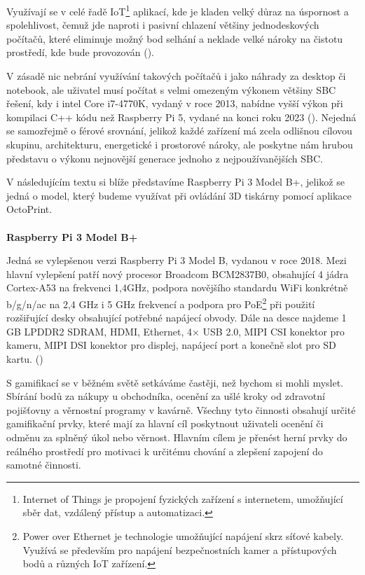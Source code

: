 \documentclass[twoside, 12pt]{article}
\begin{document}
Využívají se v celé řadě IoT\footnote{Internet of Things je propojení fyzických zařízení s internetem, umožňující sběr dat, vzdálený přístup a automatizaci.} aplikací, kde je kladen velký důraz na úspornost a spolehlivost, čemuž jde naproti i pasivní chlazení většiny jednodeskových počítačů, které eliminuje možný bod selhání a neklade velké nároky na čistotu prostředí, kde bude provozován (\cite{RaspberryPasssive}).

V zásadě nic nebrání využívání takových počítačů i jako náhrady za desktop či notebook, ale uživatel musí počítat s velmi omezeným výkonem většiny SBC řešení, kdy i intel Core i7-4770K, vydaný v roce 2013, nabídne vyšší výkon při kompilaci C++ kódu než Raspberry Pi 5, vydané na konci roku 2023 (\cite{RaspberryPerformance}). Nejedná se samozřejmě o férové srovnání, jelikož každé zařízení má zcela odlišnou cílovou skupinu, architekturu, energetické i prostorové nároky, ale poskytne nám hrubou představu o výkonu nejnovější generace jednoho z nejpoužívanějších SBC.

V následujícím textu si blíže představíme Raspberry Pi 3 Model B+, jelikož se jedná o model, který budeme využívat při ovládání 3D tiskárny pomocí aplikace OctoPrint.
\\
\\
\textbf{Raspberry Pi 3 Model B+}

Jedná se vylepšenou verzi Raspberry Pi 3 Model B, vydanou v roce 2018. Mezi hlavní vylepšení patří nový procesor Broadcom BCM2837B0, obsahující 4 jádra Cortex-A53 na frekvenci 1,4GHz, podpora novějšího standardu WiFi konkrétně b/g/n/ac na 2,4 GHz i 5 GHz frekvencí a podpora pro PoE\footnote{Power over Ethernet je technologie umožňující napájení skrz síťové kabely. Využívá se především pro napájení bezpečnostních kamer a přístupových bodů a různých IoT zařízení.} při použití rozšiřující desky obsahující potřebné napájecí obvody. Dále na desce najdeme 1 GB LPDDR2 SDRAM, HDMI, Ethernet, 4× USB 2.0, MIPI CSI konektor pro kameru, MIPI DSI konektor pro displej, napájecí port a konečně slot pro SD kartu. (\cite{Raspberry3B})


S gamifikací se v běžném světě setkáváme častěji, než bychom si mohli myslet. Sbírání bodů za nákupy u obchodníka, ocenění za ušlé kroky od zdravotní pojišťovny a věrnostní programy v kavárně. Všechny tyto činnosti obsahují určité gamifikační prvky, které mají za hlavní cíl poskytnout uživateli ocenění či odměnu za splněný úkol nebo věrnost. Hlavním cílem je přenést herní prvky do reálného prostředí pro motivaci k určitému chování a zlepšení zapojení do samotné činnosti.
\end{document}
